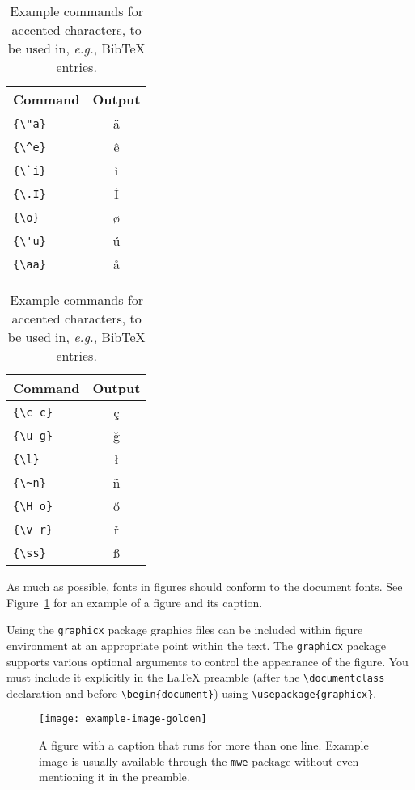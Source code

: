 \documentclass[11pt]{article}
\begin{document}
\begin{table}
  \centering
  \begin{tabular}{lc}
    \hline
    \textbf{Command} & \textbf{Output} \\
    \hline
    \verb|{\"a}|     & {\"a}           \\
    \verb|{\^e}|     & {\^e}           \\
    \verb|{\`i}|     & {\`i}           \\
    \verb|{\.I}|     & {\.I}           \\
    \verb|{\o}|      & {\o}            \\
    \verb|{\'u}|     & {\'u}           \\
    \verb|{\aa}|     & {\aa}           \\\hline
  \end{tabular}
  \begin{tabular}{lc}
    \hline
    \textbf{Command} & \textbf{Output} \\
    \hline
    \verb|{\c c}|    & {\c c}          \\
    \verb|{\u g}|    & {\u g}          \\
    \verb|{\l}|      & {\l}            \\
    \verb|{\~n}|     & {\~n}           \\
    \verb|{\H o}|    & {\H o}          \\
    \verb|{\v r}|    & {\v r}          \\
    \verb|{\ss}|     & {\ss}           \\
    \hline
  \end{tabular}
  \caption{Example commands for accented characters, to be used in, \emph{e.g.}, Bib\TeX{} entries.}
  \label{tab:accents}
\end{table}

As much as possible, fonts in figures should conform
to the document fonts. See Figure~\ref{fig:experiments} for an example of a figure and its caption.

Using the \verb|graphicx| package graphics files can be included within figure
environment at an appropriate point within the text.
The \verb|graphicx| package supports various optional arguments to control the
appearance of the figure.
You must include it explicitly in the \LaTeX{} preamble (after the
\verb|\documentclass| declaration and before \verb|\begin{document}|) using
\verb|\usepackage{graphicx}|.

\begin{figure}[t]
  \texttt{[image: example-image-golden]}
  \caption{A figure with a caption that runs for more than one line.
    Example image is usually available through the \texttt{mwe} package
    without even mentioning it in the preamble.}
  \label{fig:experiments}
\end{figure}
\end{document}
